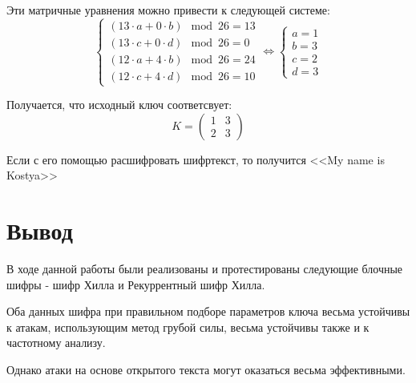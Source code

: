 \documentclass[a4paper]{article}
\begin{document}
  Эти матричные уравнения можно привести к следующей системе:
  \begin{equation}
    \begin{cases}
        (13\cdot a + 0\cdot b)\mod{26} = 13 \\
        (13\cdot c + 0\cdot d) \mod{26}= 0 \\
        (12\cdot a + 4\cdot b)\mod{26} = 24 \\
        (12\cdot c + 4\cdot d)\mod{26} = 10
    \end{cases} \Leftrightarrow \begin{cases}
        a = 1 \\
        b = 3 \\
        c = 2 \\
        d = 3
    \end{cases}
  \end{equation}

  Получается, что исходный ключ соответсвует:
  \begin{equation}
    K = \begin{pmatrix}
        1 & 3 \\ 2 & 3
    \end{pmatrix}
  \end{equation}

  Если с его помощью расшифровать шифртекст, то получится <<My name is Kostya>>

  \newpage
  \section{Вывод}

  В ходе данной работы были реализованы и протестированы следующие блочные шифры -
  шифр Хилла и Рекуррентный шифр Хилла.

  Оба данных шифра при правильном подборе параметров ключа весьма устойчивы к атакам,
  использующим метод грубой силы, весьма устойчивы также и к частотному анализу.

  Однако атаки на основе открытого текста могут оказаться весьма эффективными.
\end{document}

